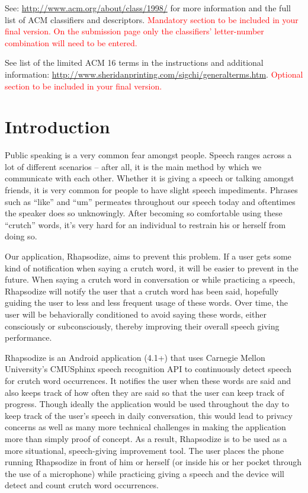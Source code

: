 \documentclass{sigchi}
\begin{document}

See: \url{http://www.acm.org/about/class/1998/}
for more information and the full list of ACM classifiers
and descriptors. 
\textcolor{red}{Mandatory section to be included in your
final version. On the submission page only the classifiers'
letter-number combination will need to be entered.}


See list of the limited ACM 16 terms in the
instructions and additional information:
\url{http://www.sheridanprinting.com/sigchi/generalterms.htm}.
\textcolor{red}{Optional section to be included in your final version.}

\section{Introduction}

Public speaking is a very common fear amongst people. Speech ranges across a lot of different scenarios -- after all, it is the main method by which we communicate with each other. Whether it is giving a speech or talking amongst friends, it is very common for people to have slight speech impediments. Phrases such as “like” and “um” permeates throughout our speech today and oftentimes the speaker does so unknowingly. After becoming so comfortable using these “crutch” words, it’s very hard for an individual to restrain his or herself from doing so.

Our application, Rhapsodize, aims to prevent this problem. If a user gets some kind of notification when saying a crutch word, it will be easier to prevent in the future. When saying a crutch word in conversation or while practicing a speech, Rhapsodize will notify the user that a crutch word has been said, hopefully guiding the user to less and less frequent usage of these words. Over time, the user will be behaviorally conditioned to avoid saying these words, either consciously or subconsciously, thereby improving their overall speech giving performance.

Rhapsodize is an Android application (4.1+) that uses Carnegie Mellon University’s CMUSphinx speech recognition API to continuously detect speech for crutch word occurrences. It notifies the user when these words are said and also keeps track of how often they are said so that the user can keep track of progress. Though ideally the application would be used throughout the day to keep track of the user’s speech in daily conversation, this would lead to privacy concerns as well as many more technical challenges in making the application more than simply proof of concept. As a result, Rhapsodize is to be used as a more situational, speech-giving improvement tool. The user places the phone running Rhapsodize in front of him or herself (or inside his or her pocket through the use of a microphone) while practicing giving a speech and the device will detect and count crutch word occurrences. 
\end{document}
